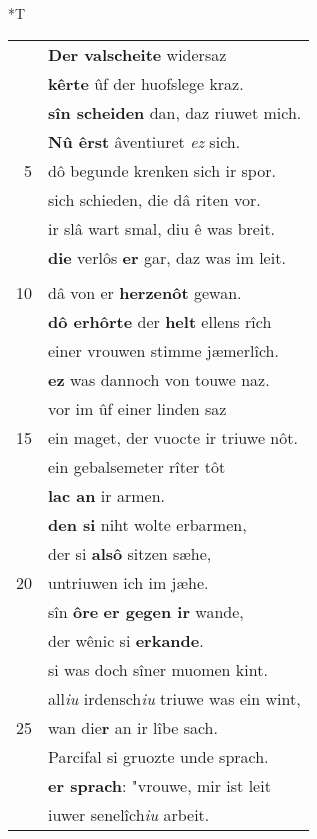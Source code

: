 \documentclass[8pt,a4paper,notitlepage]{article}
\begin{document}
\begin{table}[ht]
\begin{minipage}[t]{0.5\linewidth}
\small
\begin{center}*T
\end{center}
\begin{tabular}{rl}
 & \textbf{Der valscheite} widersaz\\ 
 & \textbf{kêrte} ûf der huofslege kraz.\\ 
 & \textbf{sîn scheiden} dan, daz riuwet mich.\\ 
 & \textbf{Nû êrst} âventiuret \textit{ez} sich.\\ 
5 & dô begunde krenken sich ir spor.\\ 
 & sich schieden, die dâ riten vor.\\ 
 & ir slâ wart smal, diu ê was breit.\\ 
 & \textbf{die} verlôs \textbf{er} gar, daz was im leit.\\ 
 & \textbf{\begin{large}M\end{large}ære} vriesch der junge man,\\ 
10 & dâ von er \textbf{herzenôt} gewan.\\ 
 & \textbf{dô erhôrte} der \textbf{helt} ellens rîch\\ 
 & einer vrouwen stimme jæmerlîch.\\ 
 & \textbf{ez} was dannoch von touwe naz.\\ 
 & vor im ûf einer linden saz\\ 
15 & ein maget, der vuocte ir triuwe nôt.\\ 
 & ein gebalsemeter rîter tôt\\ 
 & \textbf{lac an} ir armen.\\ 
 & \textbf{den si} niht wolte erbarmen,\\ 
 & der si \textbf{alsô} sitzen sæhe,\\ 
20 & untriuwen ich im jæhe.\\ 
 & sîn \textbf{ôre} \textbf{er gegen ir} wande,\\ 
 & der wênic si \textbf{erkande}.\\ 
 & si was doch sîner muomen kint.\\ 
 & all\textit{iu} irdensch\textit{iu} triuwe was ein wint,\\ 
25 & wan die\textbf{r} an ir lîbe sach.\\ 
 & Parcifal si gruozte unde sprach.\\ 
 & \textbf{er sprach}: "vrouwe, mir ist leit\\ 
 & iuwer senelîch\textit{iu} arbeit.\\ 

\end{tabular}
\end{minipage}
\end{table}
\end{document}
